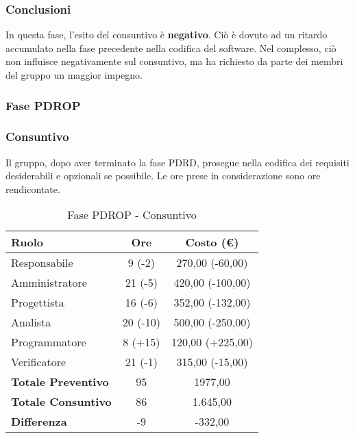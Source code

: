 \documentclass[../PianoProgetto.tex]{subfiles}
\begin{document}
	\subsubsection{Conclusioni}	
     In questa fase, l'esito del consuntivo è \textbf{negativo}. 
     Ciò è dovuto ad un ritardo accumulato nella fase precedente nella codifica del software\g. Nel complesso, ciò non influisce negativamente sul consuntivo, ma ha richiesto da parte dei membri del gruppo un maggior impegno.
     
     
     \subsubsection{Fase PDROP}
	\subsubsection{Consuntivo}
	Il gruppo, dopo aver terminato la fase PDRD, prosegue nella codifica dei requisiti desiderabili e opzionali se possibile. Le ore prese in considerazione sono ore rendicontate.
	
	\newpage
	\begin{table}[h]
		\centering
		\begin{tabular}{l * {2}{c}}
			\toprule
			\textbf{Ruolo} & \textbf{Ore} & \textbf{Costo (\euro{})} \\
			\midrule
			Responsabile &		9 (-2) & 270,00 (-60,00) \\
			Amministratore &	21 (-5) & 420,00  (-100,00) \\
			Progettista & 		16 (-6) & 352,00  (-132,00)\\
			Analista & 			20	(-10)	& 500,00   (-250,00)       \\
			Programmatore & 	8	(+15)	& 120,00 	(+225,00)			\\
			Verificatore & 		21 (-1) & 315,00 (-15,00)	\\
			\midrule
			\textbf{Totale Preventivo} & 95
			& 1977,00
			\\		
			\textbf{Totale Consuntivo} & 86 & 1.645,00
			\\
			\midrule
			\textbf{Differenza} & -9 & -332,00 \\
			\bottomrule
		\end{tabular}
		
		\caption{Fase PDROP - Consuntivo}
		\label{tab:consuntivoPDROP}
		
	\end{table}			
	
\end{document}
